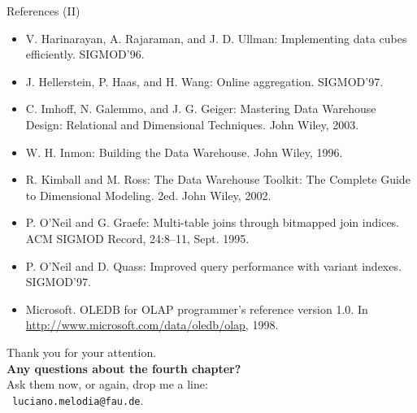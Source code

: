 \documentclass[aspectratio=169,t]{beamer}
\begin{document}
  {
    \begin{frame}{References (II)}
    \begin{itemize}
      \item V. Harinarayan, A. Rajaraman, and J. D. Ullman: Implementing data cubes efficiently. SIGMOD'96.
      \item J. Hellerstein, P. Haas, and H. Wang: Online aggregation. SIGMOD'97.
      \item C. Imhoff, N. Galemmo, and J. G. Geiger: Mastering Data Warehouse Design: Relational and Dimensional Techniques. John Wiley, 2003.
      \item W. H. Inmon: Building the Data Warehouse. John Wiley, 1996.
      \item R. Kimball and M. Ross: The Data Warehouse Toolkit: The Complete Guide to Dimensional Modeling. 2ed. John Wiley, 2002.
      \item P. O’Neil and G. Graefe: Multi-table joins through bitmapped join indices. ACM SIGMOD Record, 24:8–11, Sept. 1995.
      \item P. O'Neil and D. Quass: Improved query performance with variant indexes. SIGMOD'97.
      \item Microsoft. OLEDB for OLAP programmer's reference version 1.0. In \href{http://www.microsoft.com/data/oledb/olap}{http://www.microsoft.com/data/oledb/olap}, 1998.
    \end{itemize}
    \end{frame}
  }

  { %
    \begin{frame}[c]
      \begin{center}
        Thank you for your attention.\\
        {\bf Any questions about the fourth chapter?}\\[0.5cm]
        Ask them now, or again, drop me a line: \\ 
        \faSendO \ \texttt{luciano.melodia@fau.de}.
      \end{center}
    \end{frame}
  }
\end{document}
